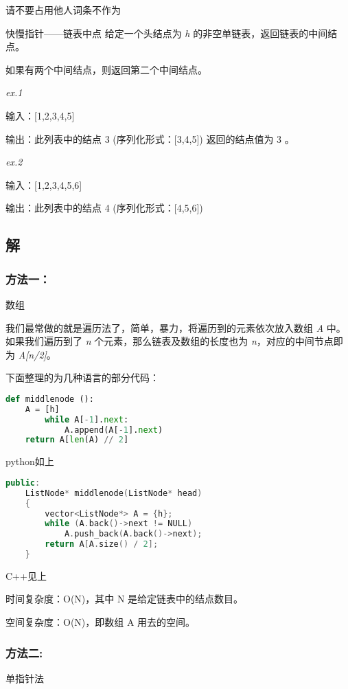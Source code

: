 
\begin{issues}
\issueDraft 请不要占用他人词条不作为
\end{issues}

\begin{example}{快慢指针——链表中点}
给定一个头结点为 \textsl{h} 的非空单链表，返回链表的中间结点。

如果有两个中间结点，则返回第二个中间结点。

\textsl{ex.1}

输入：[1,2,3,4,5] 

输出：此列表中的结点 3 (序列化形式：[3,4,5])
返回的结点值为 3 。

\textsl{ex.2}

输入：[1,2,3,4,5,6]

输出：此列表中的结点 4 (序列化形式：[4,5,6])
\end{example}

\subsection{解}
\subsubsection{方法一：}
数组

我们最常做的就是遍历法了，简单，暴力，将遍历到的元素依次放入数组 \textsl{A }中。如果我们遍历到了 \textsl{n }个元素，那么链表及数组的长度也为 \textsl{n}，对应的中间节点即为 \textsl{A[n/2]}。

下面整理的为几种语言的部分代码：
\begin{lstlisting}[language=python]
def middlenode ():
    A = [h]
        while A[-1].next:
            A.append(A[-1].next)
    return A[len(A) // 2]

\end{lstlisting}
python如上
\begin{lstlisting}[language=cpp]
public:
    ListNode* middlenode(ListNode* head) 
    {
        vector<ListNode*> A = {h};
        while (A.back()->next != NULL)
            A.push_back(A.back()->next);
        return A[A.size() / 2];
    }
\end{lstlisting}
C++见上

时间复杂度：O(N)，其中 N 是给定链表中的结点数目。

空间复杂度：O(N)，即数组 A 用去的空间。
\subsubsection{方法二:}
单指针法

